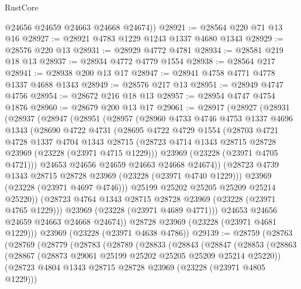 \begin{lexlean}{RustCore}
\begin{coremodule}
        @24656
        @24659
        @24663
        @24668
        @24674))
@28921 := @28564 @220 @71 @13 @16
@28927 := @28921 @4783 @1229 @1243 @1337 @4680 @1343
@28929 := @28576 @220 @13
@28931 := @28929 @4772 @4781
@28934 := @28581 @219 @18 @13
@28937 := @28934 @4772 @4779 @1554
@28938 := @28564 @217
@28941 := @28938 @200 @13 @17
@28947 := @28941 @4758 @4771 @4778 @1337 @4688 @1343
@28949 := @28576 @217 @13
@28951 := @28949 @4747 @4756
@28954 := @28672 @216 @18 @13
@28957 := @28954 @4747 @4754 @1876
@28960 := @28679 @200 @13 @17
@29061 := @28917
    (@28927
      (@28931
        (@28937
          (@28947
            (@28951
              (@28957
                (@28960
                  @4733
                  @4746
                  @4753
                  @1337
                  @4696
                  @1343
                  (@28690
                    @4722
                    @4731
                    (@28695
                      @4722
                      @4729
                      @1554
                      (@28703
                        @4721
                        @4728
                        @1337
                        @4704
                        @1343
                        @28715
                        (@28723 @4714 @1343 @28715 @28728 @23969 (@23228 (@23971 @4715 @1229)))
                        @23969
                        (@23228 (@23971 @4705 @4721)))
                      @24653
                      @24656
                      @24659
                      @24663
                      @24668
                      @24674))
                  (@28723 @4739 @1343 @28715 @28728 @23969 (@23228 (@23971 @4740 @1229)))
                  @23969
                  (@23228 (@23971 @4697 @4746)))
                @25199
                @25202
                @25205
                @25209
                @25214
                @25220))
            (@28723 @4764 @1343 @28715 @28728 @23969 (@23228 (@23971 @4765 @1229)))
            @23969
            (@23228 (@23971 @4689 @4771)))
          @24653
          @24656
          @24659
          @24663
          @24668
          @24674))
      @28728
      @23969
      (@23228 (@23971 @4681 @1229)))
    @23969
    (@23228 (@23971 @4638 @4786))
@29139 := @28759
    (@28763
      (@28769
        (@28779
          (@28783
            (@28789
              (@28833
                (@28843
                  (@28847
                    (@28853
                      (@28863
                        (@28867 (@28873 @29061 @25199 @25202 @25205 @25209 @25214 @25220))
                        (@28723 @4804 @1343 @28715 @28728 @23969 (@23228 (@23971 @4805 @1229)))

\end{coremodule}
\end{lexlean}
